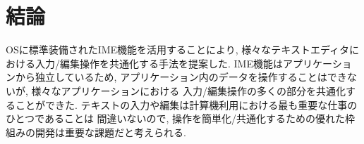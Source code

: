 \section{結論}

OSに標準装備されたIME機能を活用することにより,
様々なテキストエディタにおける入力/編集操作を共通化する手法を提案した.
IME機能はアプリケーションから独立しているため,
アプリケーション内のデータを操作することはできないが,
様々なアプリケーションにおける
入力/編集操作の多くの部分を共通化することができた.
%
テキストの入力や編集は計算機利用における最も重要な仕事のひとつであることは
間違いないので,
操作を簡単化/共通化するための優れた枠組みの開発は重要な課題だと考えられる.

